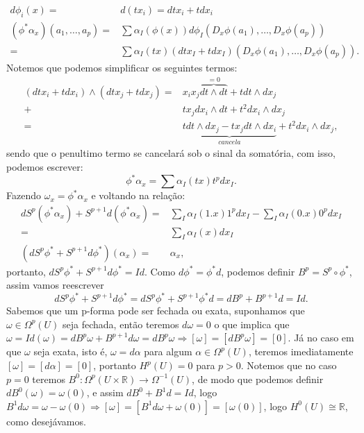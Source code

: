 \documentclass{article}
\begin{document}
	$$
	\begin{aligned}
	d\phi_{i}(x) =& d(tx_{i}) = dtx_{i} + tdx_{i} 
	\\
	(\phi^{*}\alpha_{x})(a_{1},\dots,a_{p}) =& \sum \alpha_{I}(\phi(x))d\phi_{I}(D_{x}\phi(a_{1}),\dots, D_{x}\phi(a_{p}))
	\\
	=& \sum \alpha_{I}(tx)(dtx_{I} + tdx_{I})(D_{x}\phi(a_{1}),\dots, D_{x}\phi(a_{p})).
	\end{aligned}
	$$
	Notemos que podemos simplificar os seguintes termos: 
	$$
	\begin{aligned}
	(dtx_{i} + tdx_{i}) \wedge (dtx_{j} + tdx_{j}) =& x_{i}x_{j} \overbrace{ dt \wedge dt}^{=0} + tdt \wedge dx_{j} 
	\\
	+& tx_{j}dx_{i}\wedge dt + t^{2} dx_{i} \wedge dx_{j}
	\\
	=& \underbrace{ tdt \wedge dx_{j} - tx_{j} dt \wedge dx_{i} }_{cancela}+ t^{2} dx_{i} \wedge dx_{j},
	\end{aligned}
	$$
	sendo que o penultimo termo se cancelará sob o sinal da somatória, com isso, podemos escrever: 
	$$
	\phi^{*}\alpha_{x} = \sum \alpha_{I}(tx) t^{p} dx_{I}.
	$$
	Fazendo $\omega_{x} = \phi^{*}\alpha_{x}$ e voltando na relação:
	$$
	\begin{aligned}
   	dS^{p}(\phi^{*}\alpha_{x}) + S^{p+1}d(\phi^{*}\alpha_{x}) 
	 =& \sum_{I} \alpha_{I}(1.x) 1^{p} dx_{I} - \sum_{I} \alpha_{I}(0.x) 0^{p} dx_{I}
	 \\
	 =& \sum_{I} \alpha_{I}(x) dx_{I}
	 \\
	 (dS^{p}\phi^{*} + S^{p+1}d\phi^{*})(\alpha_{x}) =& \alpha_{x},
	\end{aligned}$$
	portanto, $dS^{p}\phi^{*} + S^{p+1}d\phi^{*} = Id$. Como $d\phi^{*} = \phi^{*}d$, podemos definir $B^{p} = S^{p}\circ\phi^{*}$, assim vamos reescrever
	$$
	dS^{p}\phi^{*} + S^{p+1}d\phi^{*} = dS^{p}\phi^{*} + S^{p+1}\phi^{*}d = dB^{p} + B^{p+1}d = Id.
	$$
	Sabemos que um p-forma pode ser fechada ou exata, suponhamos que $\omega \in \Omega^{p}(U)$ seja fechada, então teremos $d\omega = 0$ o que implica que $\omega = Id(\omega) = dB^{p}\omega + B^{p+1}d\omega = dB^{p}\omega \Rightarrow [\omega] = [dB^{p}\omega] = [0]$. Já no caso em que $\omega$ seja exata, isto é, $\omega = d\alpha$ para algum $\alpha \in \Omega^{p}(U)$, teremos imediatamente $[\omega] =[d\alpha] = [0]$, portanto $H^{p}(U) = 0$ para $p>0$. Notemos que no caso $p=0$ teremos $B^{0} :\Omega^{p}(U \times \mathbb{R}) \to \Omega^{-1}(U)$, de modo que podemos definir $dB^{0}(\omega) = \omega(0)$, e assim $dB^{0} + B^{1}d = Id$, logo $B^{1}d\omega = \omega - \omega(0) \Rightarrow [\omega] = [B^{1}d\omega + \omega(0)] = [\omega(0)]$, logo $H^{0}(U) \cong \mathbb{R}$, como desejávamos.
	
\end{document}
